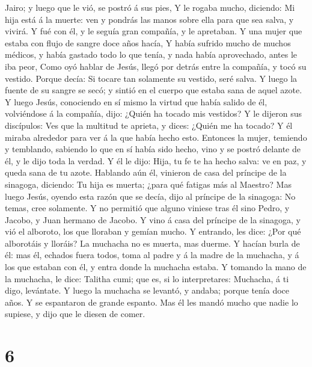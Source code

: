 Jairo; y luego que le vió, se postró á sus pies,  Y le
rogaba mucho, diciendo: Mi hija está á la muerte: ven y pondrás las
manos sobre ella para que sea salva, y vivirá.  Y fué con
él, y le seguía gran compañía, y le apretaban.  Y una
mujer que estaba con flujo de sangre doce años hacía,  Y
había sufrido mucho de muchos médicos, y había gastado todo lo que
tenía, y nada había aprovechado, antes le iba peor,  Como
oyó hablar de Jesús, llegó por detrás entre la compañía, y tocó su
vestido.  Porque decía: Si tocare tan solamente su
vestido, seré salva.  Y luego la fuente de su sangre se
secó; y sintió en el cuerpo que estaba sana de aquel azote.
 Y luego Jesús, conociendo en sí mismo la virtud que
había salido de él, volviéndose á la compañía, dijo: ¿Quién ha tocado
mis vestidos?  Y le dijeron sus discípulos: Ves que la
multitud te aprieta, y dices: ¿Quién me ha tocado?  Y él
miraba alrededor para ver á la que había hecho esto. 
Entonces la mujer, temiendo y temblando, sabiendo lo que en sí había
sido hecho, vino y se postró delante de él, y le dijo toda la verdad.
 Y él le dijo: Hija, tu fe te ha hecho salva: ve en paz,
y queda sana de tu azote.  Hablando aún él, vinieron de
casa del príncipe de la sinagoga, diciendo: Tu hija es muerta; ¿para qué
fatigas más al Maestro?  Mas luego Jesús, oyendo esta
razón que se decía, dijo al príncipe de la sinagoga: No temas, cree
solamente.  Y no permitió que alguno viniese tras él sino
Pedro, y Jacobo, y Juan hermano de Jacobo.  Y vino á casa
del príncipe de la sinagoga, y vió el alboroto, los que lloraban y
gemían mucho.  Y entrando, les dice: ¿Por qué alborotáis
y lloráis? La muchacha no es muerta, mas duerme.  Y
hacían burla de él: mas él, echados fuera todos, toma al padre y á la
madre de la muchacha, y á los que estaban con él, y entra donde la
muchacha estaba.  Y tomando la mano de la muchacha, le
dice: Talitha cumi; que es, si lo interpretares: Muchacha, á ti digo,
levántate.  Y luego la muchacha se levantó, y andaba;
porque tenía doce años. Y se espantaron de grande espanto.
 Mas él les mandó mucho que nadie lo supiese, y dijo que
le diesen de comer.

\hypertarget{section-5}{%
\section{6}\label{section-5}}

